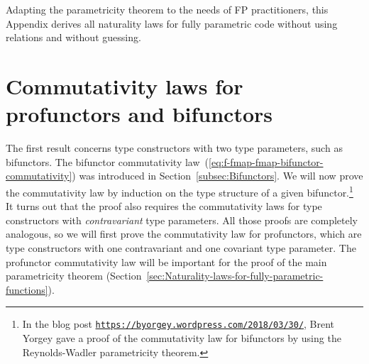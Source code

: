Adapting the parametricity theorem to the needs of FP practitioners,
this Appendix derives all naturality laws for fully parametric code
without using relations and without guessing.%
\begin{comment}
Additional literature:

{[}1{]}: Girard, J.-Y.; Scedrov, A. \& Scott, P. J. Normal Forms and
Cut-Free Proofs as Natural Transformations. Logic From Computer Science,
Mathematical Science Research Institute Publications 21, Springer-Verlag,
1992, 217-241. http://citeseer.ist.psu.edu/viewdoc/summary?doi=10.1.1.41.811

{[}2{]}: Bainbridge, E. S.; Freyd, P. J.; Scedrov, A. \& Scott, P.
J. Functorial polymorphism. Theoretical computer science, Elsevier,
1990, 70, 35-64. https://core.ac.uk/display/82270459

{[}3{]}: De Lataillade, J. Dinatural Terms in System F. Logic in Computer
Science, 24th Annual IEEE Symposium, 267-276, 2009. https://www.irif.fr/\textasciitilde delatail/dinat.pdf

{[}4{]}: Pistone, P. On completeness and parametricity in the realizability
semantics of System F. https://arxiv.org/abs/1802.05143

See discussion here: https://cstheory.stackexchange.com/questions/42256/is-case-analysis-on-normal-forms-of-lambda-terms-sufficient-to-prove-parametrici
\end{comment}


\section{Commutativity laws for profunctors and bifunctors\label{sec:Commutativity-laws-for-type-constructors}}

The first result concerns type constructors with two type parameters,
such as bifunctors. The bifunctor commutativity law~(\ref{eq:f-fmap-fmap-bifunctor-commutativity})
was introduced in Section~\ref{subsec:Bifunctors}. We will now prove
the commutativity law by induction on the type structure of a given
bifunctor.\footnote{In the blog post \texttt{\href{https://byorgey.wordpress.com/2018/03/30/}{https://byorgey.wordpress.com/2018/03/30/}},
Brent Yorgey gave a proof of the commutativity
law for bifunctors by using the Reynolds-Wadler parametricity theorem. } It turns out that the proof also requires the commutativity laws
for type constructors with \emph{contravariant} type parameters. All
those proofs are completely analogous, so we will first prove the
commutativity law for profunctors, which are type constructors with
one contravariant and one covariant type parameter. The profunctor
commutativity law will be important for the proof of the main parametricity
theorem (Section~\ref{sec:Naturality-laws-for-fully-parametric-functions}). 

